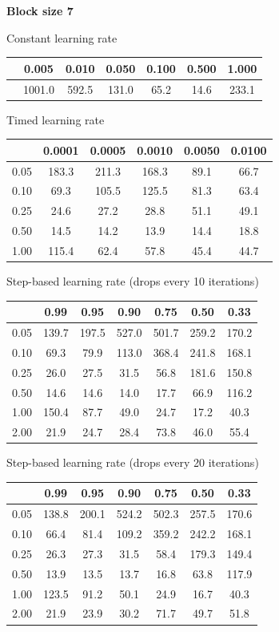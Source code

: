 \documentclass[a4paper,14pt,oneside,openany]{memoir}
\begin{document}
	\textbf{Block size 7} 
	
	Constant learning rate 
	
	\begin{tabular}{|c|c|c|c|c|c|c|}
	\hline 
	 &0.005 &0.010 &0.050 &0.100 &0.500 &1.000 \\
	 \hline 
	 &1001.0 &592.5 &131.0 &65.2 &14.6 &233.1 \\
	 \hline 
	
	\end{tabular}
	
	Timed learning rate 
	
	\begin{tabular}{|c|c|c|c|c|c|}
	\hline 
	 &0.0001 &0.0005 &0.0010 &0.0050 &0.0100 \\
	 \hline 
	0.05 &183.3 &211.3 &168.3 &89.1 &66.7 \\
	 \hline 
	0.10 &69.3 &105.5 &125.5 &81.3 &63.4 \\
	 \hline 
	0.25 &24.6 &27.2 &28.8 &51.1 &49.1 \\
	 \hline 
	0.50 &14.5 &14.2 &13.9 &14.4 &18.8 \\
	 \hline 
	1.00 &115.4 &62.4 &57.8 &45.4 &44.7 \\
	 \hline 
	
	\end{tabular}
	
	Step-based learning rate (drops every 10 iterations) 
	
	\begin{tabular}{|c|c|c|c|c|c|c|}
	\hline 
	 &0.99 &0.95 &0.90 &0.75 &0.50 &0.33 \\
	 \hline 
	0.05 &139.7 &197.5 &527.0 &501.7 &259.2 &170.2 \\
	 \hline 
	0.10 &69.3 &79.9 &113.0 &368.4 &241.8 &168.1 \\
	 \hline 
	0.25 &26.0 &27.5 &31.5 &56.8 &181.6 &150.8 \\
	 \hline 
	0.50 &14.6 &14.6 &14.0 &17.7 &66.9 &116.2 \\
	 \hline 
	1.00 &150.4 &87.7 &49.0 &24.7 &17.2 &40.3 \\
	 \hline 
	2.00 &21.9 &24.7 &28.4 &73.8 &46.0 &55.4 \\
	 \hline 
	
	\end{tabular}
	
	Step-based learning rate (drops every 20 iterations) 
	
	\begin{tabular}{|c|c|c|c|c|c|c|}
	\hline 
	 &0.99 &0.95 &0.90 &0.75 &0.50 &0.33 \\
	 \hline 
	0.05 &138.8 &200.1 &524.2 &502.3 &257.5 &170.6 \\
	 \hline 
	0.10 &66.4 &81.4 &109.2 &359.2 &242.2 &168.1 \\
	 \hline 
	0.25 &26.3 &27.3 &31.5 &58.4 &179.3 &149.4 \\
	 \hline 
	0.50 &13.9 &13.5 &13.7 &16.8 &63.8 &117.9 \\
	 \hline 
	1.00 &123.5 &91.2 &50.1 &24.9 &16.7 &40.3 \\
	 \hline 
	2.00 &21.9 &23.9 &30.2 &71.7 &49.7 &51.8 \\
	 \hline 
	
	\end{tabular}
	
\end{document}
